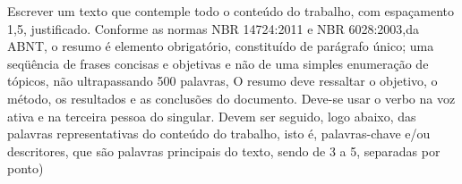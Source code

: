 \begin{resumo}
Escrever um texto que contemple todo o conteúdo do trabalho, com espaçamento
1,5, justificado. Conforme as normas NBR 14724:2011 e NBR 6028:2003,da ABNT,
o resumo é elemento obrigatório, constituído de parágrafo único; uma seqüência de
frases concisas e objetivas e não de uma simples enumeração de tópicos, não
ultrapassando 500 palavras, O resumo deve ressaltar o objetivo, o método, os
resultados e as conclusões do documento. Deve-se usar o verbo na voz ativa e na
terceira pessoa do singular. Devem ser seguido, logo abaixo, das palavras
representativas do conteúdo do trabalho, isto é, palavras-chave e/ou descritores,
que são palavras principais do texto, sendo de 3 a 5, separadas por ponto)
\end{resumo}	
